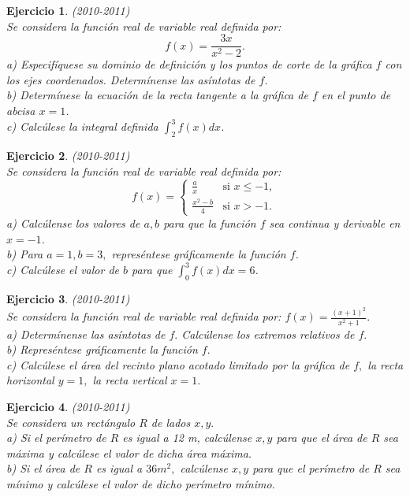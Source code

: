 \documentclass[12pt, a4paper]{amsart}
\newtheorem{ejer}{Ejercicio}
\begin{document}

\begin{ejer}\em (2010-2011)\\%
Se considera la función real de variable real definida por:
$$
f(x)=\frac{3x}{x^2-2}.
$$
a) Especifíquese su dominio de definición y los puntos de corte de la gráfica $f$ con los ejes coordenados. Determínense las asíntotas de $f$.\\
b) Determínese la ecuación de la recta tangente a la gráfica de $f$ en el punto de abcisa $x=1$.\\
c) Calcúlese la integral definida $\int_2^3f(x)dx$.
\end{ejer}

\begin{ejer}\em (2010-2011)\\%
Se considera la función real de variable real definida por:
\begin{equation*}
f(x)=\left \{ \begin{matrix} \frac{a}{x} & \mbox{si } x\leq -1,
\\ \frac{x^2-b}{4} & \mbox{si } x > -1. \end{matrix}\right. 
\end{equation*}
a) Calcúlense los valores de $a,b$ para que la función $f$ sea continua y derivable en $x=-1$.\\
b) Para $a=1,b=3,$ represéntese gráficamente la función $f$.\\
c) Calcúlese el valor de $b$ para que $\int_0^3f(x)dx=6$.
\end{ejer}

\begin{ejer}\em (2010-2011)\\
Se considera la función real de variable real definida por: $f(x)=\frac{(x+1)^2}{x^2+1}.$\\
a) Determínense las asíntotas de $f.$ Calcúlense los extremos relativos de $f.$\\
b) Represéntese gráficamente la función $f.$\\
c) Calcúlese el área del recinto plano acotado limitado por la gráfica de $f,$ la recta horizontal $y=1,$ la recta vertical $x=1.$
\end{ejer}

\begin{ejer}\em (2010-2011)\\
Se considera un rectángulo $R$ de lados $x,y.$\\
a) Si el perímetro de $R$ es igual a 12 m, calcúlense $x,y$ para que el área de $R$ sea máxima y calcúlese el valor de dicha área máxima.\\
b) Si el área de $R$ es igual a $36 m^2,$ calcúlense $x,y$ para que el perímetro de $R$ sea mínimo y calcúlese el valor de dicho perímetro mínimo.
\end{ejer}
\end{document}
